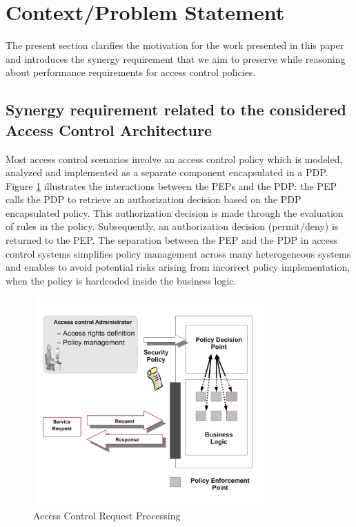 \section{Context/Problem Statement} \label{sec:context}

The present section clarifies the motivation for the work presented in this paper and introduces the synergy requirement that we aim to 
preserve while reasoning about performance requirements for access control policies.

\subsection{Synergy requirement related to the considered Access Control Architecture}
Most access control scenarios involve an access control policy which is modeled, analyzed and implemented as a separate component 
encapsulated in a PDP. Figure \ref{pep-pdp} illustrates the interactions between the PEPs and the PDP: the PEP calls the PDP to 
retrieve an authorization decision based on the PDP encapsulated policy. This authorization decision is made through the evaluation of rules in the policy. 
Subsequently, an authorization decision (permit/deny) is returned to the PEP.
The separation between the PEP and the PDP in access control systems simplifies policy management across many heterogeneous systems and enables to avoid
 potential risks arising from incorrect policy implementation, when the policy is hardcoded inside the business logic.

\begin{figure}[!h]
\begin{center}
\includegraphics[width=9cm, height=8cm]{business-logic}
\caption{Access Control Request Processing}
\label{pep-pdp}
\end{center}
\end{figure}

